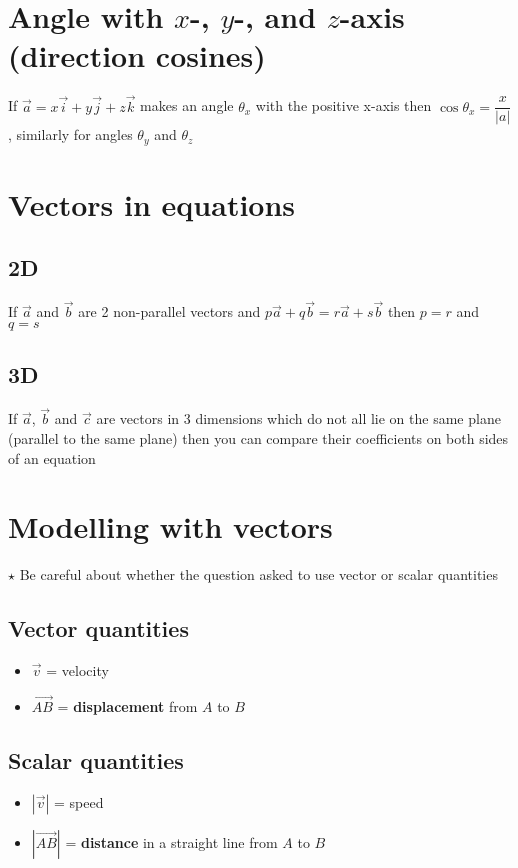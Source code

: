 \section{Angle with $x$-, $y$-, and $z$-axis (direction cosines)}
If $\vec{a}=x\vec{i}+y\vec{j}+z\vec{k}$ makes an angle $\theta_x$ with the positive x-axis then $\cos \theta_x=\dfrac{x}{|a|}$, similarly for angles $\theta_y$ and $\theta_z$

\section{Vectors in equations}
\subsection{2D}
If $\vec{a}$ and $\vec{b}$ are 2 non-parallel vectors and $p\vec{a}+q\vec{b}=r\vec{a}+s\vec{b}$ then $p=r$ and $q=s$

\subsection{3D}
If $\vec{a}$, $\vec{b}$ and $\vec{c}$ are vectors in 3 dimensions which do not all lie on the same plane (parallel to the same plane) then you can compare their coefficients on both sides of an equation

\section{Modelling with vectors}
$\star$ Be careful about whether the question asked to use vector or scalar quantities
\subsection{Vector quantities}
\begin{itemize}
    \item $\vec{v}$ = velocity
    \item $\overrightarrow{AB}$ = \textbf{displacement} from $A$ to $B$
\end{itemize}

\subsection{Scalar quantities}
\begin{itemize}
    \item $|\vec{v}|$ = speed
    \item $|\overrightarrow{AB}|$ = \textbf{distance} in a straight line from $A$ to $B$
\end{itemize}